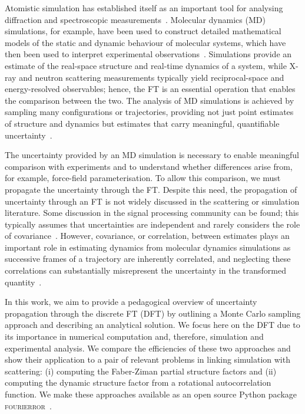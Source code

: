 \documentclass[reprint,
               superscriptaddress,
               nobibnotes,
               amsmath,
               amssymb,
               aps,
               hidelinks, 
               pre]{revtex4-2}
\begin{document}
Atomistic simulation has established itself as an important tool for analysing diffraction and spectroscopic measurements~\cite{Coles2023, Legein2024, Armstrong2022}.
Molecular dynamics (MD) simulations, for example, have been used to construct detailed mathematical models of the static and dynamic behaviour of molecular systems, which have then been used to interpret experimental observations~\cite{Richardson2026}.
Simulations provide an estimate of the real-space structure and real-time dynamics of a system, while X-ray and neutron scattering measurements typically yield reciprocal-space and energy-resolved observables; hence, the FT is an essential operation that enables the comparison between the two. 
The analysis of MD simulations is achieved by sampling many configurations or trajectories, providing not just point estimates of structure and dynamics but estimates that carry meaningful, quantifiable uncertainty~\cite{McCluskey2024}. 

The uncertainty provided by an MD simulation is necessary to enable meaningful comparison with experiments and to understand whether differences arise from, for example, force-field parameterisation. 
To allow this comparison, we must propagate the uncertainty through the FT. 
Despite this need, the propagation of uncertainty through an FT is not widely discussed in the scattering or simulation literature.
Some discussion in the signal processing community can be found; this typically assumes that uncertainties are independent and rarely considers the role of covariance~\cite{ForniesMarquina1997}. 
However, covariance, or correlation, between estimates plays an important role in estimating dynamics from molecular dynamics simulations as successive frames of a trajectory are inherently correlated, and neglecting these correlations can substantially misrepresent the uncertainty in the transformed quantity~\cite{McCluskey2024}. 

In this work, we aim to provide a pedagogical overview of uncertainty propagation through the discrete FT (DFT) by outlining a Monte Carlo sampling approach and describing an analytical solution. 
We focus here on the DFT due to its importance in numerical computation and, therefore, simulation and experimental analysis. 
We compare the efficiencies of these two approaches and show their application to a pair of relevant problems in linking simulation with scattering: (i) computing the Faber-Ziman partial structure factors and (ii) computing the dynamic structure factor from a rotational autocorrelation function. 
We make these approaches available as an open source Python package \textsc{fourierror}~\cite{FourierrorGithub}.
\end{document}
